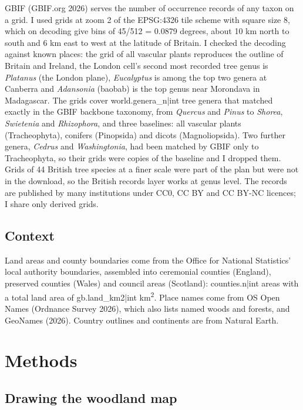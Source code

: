 \documentclass[11pt,a4paper]{article}
\begin{document}
GBIF (GBIF.org 2026) serves the number of occurrence records of any taxon on a grid. I used grids at zoom 2 of the EPSG:4326 tile scheme with square size 8, which on decoding give bins of 45/512 = 0.0879 degrees, about 10 km north to south and 6 km east to west at the latitude of Britain. I checked the decoding against known places: the grid of all vascular plants reproduces the outline of Britain and Ireland, the London cell's second most recorded tree genus is \textit{Platanus} (the London plane), \textit{Eucalyptus} is among the top two genera at Canberra and \textit{Adansonia} (baobab) is the top genus near Morondava in Madagascar. The grids cover {{world.genera_n|int}} tree genera that matched exactly in the GBIF backbone taxonomy, from \textit{Quercus} and \textit{Pinus} to \textit{Shorea}, \textit{Swietenia} and \textit{Rhizophora}, and three baselines: all vascular plants (Tracheophyta), conifers (Pinopsida) and dicots (Magnoliopsida). Two further genera, \textit{Cedrus} and \textit{Washingtonia}, had been matched by GBIF only to Tracheophyta, so their grids were copies of the baseline and I dropped them. Grids of 44 British tree species at a finer scale were part of the plan but were not in the download, so the British records layer works at genus level. The records are published by many institutions under CC0, CC BY and CC BY-NC licences; I share only derived grids.

\subsection{Context}

Land areas and county boundaries come from the Office for National Statistics' local authority boundaries, assembled into ceremonial counties (England), preserved counties (Wales) and council areas (Scotland): {{counties.n|int}} areas with a total land area of {{gb.land_km2|int}} km\textsuperscript{2}. Place names come from OS Open Names (Ordnance Survey 2026), which also lists named woods and forests, and GeoNames (2026). Country outlines and continents are from Natural Earth.

\section{Methods}

\subsection{Drawing the woodland map}
\end{document}
